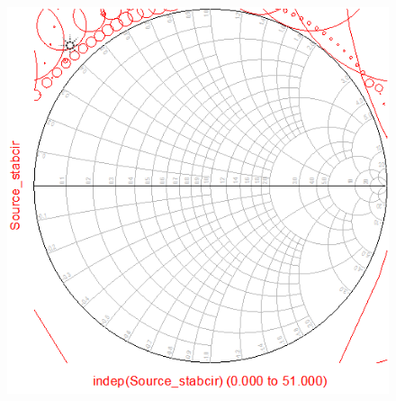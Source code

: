   \begin{figure}[H]
	  \begin{minipage}[b]{.45\textwidth}
	  \centering
	  \includegraphics[width=\linewidth]{img/Stabilization_source_circle}
	  \label{fig:Stabcircle_in}
  \end{minipage}%
  \begin{minipage}{.1\textwidth}
	  \hspace{\linewidth}
  \end{minipage}%
  \begin{minipage}[b]{.45\textwidth}
	  \centering

\end{minipage}
\end{figure}
